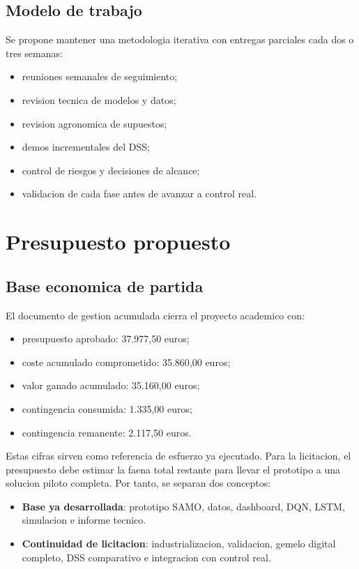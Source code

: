 ﻿\documentclass[11pt,a4paper]{article}
\begin{document}
\subsection{Modelo de trabajo}

Se propone mantener una metodologia iterativa con entregas parciales cada dos o tres semanas:

\begin{itemize}
    \item reuniones semanales de seguimiento;
    \item revision tecnica de modelos y datos;
    \item revision agronomica de supuestos;
    \item demos incrementales del DSS;
    \item control de riesgos y decisiones de alcance;
    \item validacion de cada fase antes de avanzar a control real.
\end{itemize}

\newpage

\section{Presupuesto propuesto}

\subsection{Base economica de partida}

El documento de gestion acumulada cierra el proyecto academico con:

\begin{itemize}
    \item presupuesto aprobado: 37.977,50 euros;
    \item coste acumulado comprometido: 35.860,00 euros;
    \item valor ganado acumulado: 35.160,00 euros;
    \item contingencia consumida: 1.335,00 euros;
    \item contingencia remanente: 2.117,50 euros.
\end{itemize}

Estas cifras sirven como referencia de esfuerzo ya ejecutado. Para la licitacion, el presupuesto debe estimar la faena total restante para llevar el prototipo a una solucion piloto completa. Por tanto, se separan dos conceptos:

\begin{itemize}
    \item \textbf{Base ya desarrollada}: prototipo SAMO, datos, dashboard, DQN, LSTM, simulacion e informe tecnico.
    \item \textbf{Continuidad de licitacion}: industrializacion, validacion, gemelo digital completo, DSS comparativo e integracion con control real.
\end{itemize}
\end{document}
